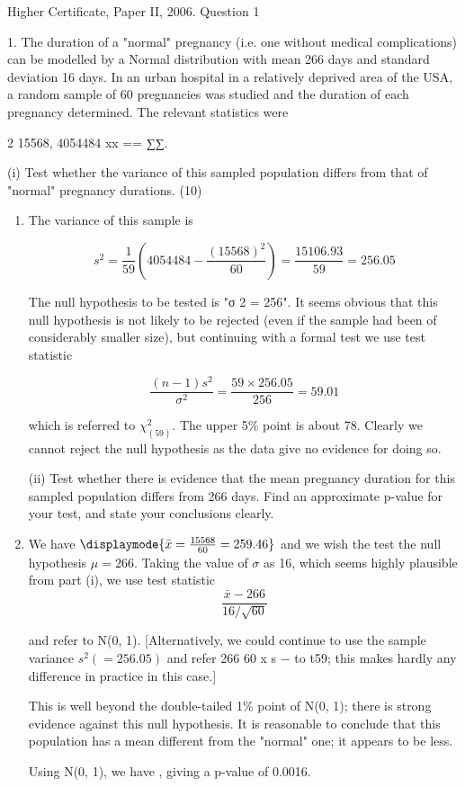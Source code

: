 \documentclass[a4paper,12pt]{article}
\begin{document}
Higher Certificate, Paper II, 2006.  Question 1 
\begin{framed}

1. The duration of a "normal" pregnancy (i.e. one without medical complications) can be modelled by a Normal distribution with mean 266 days and standard deviation 16 days.  In an urban hospital in a relatively deprived area of the USA, a random sample of 60 pregnancies was studied and the duration of each pregnancy determined.  The relevant statistics were 
 
2 15568, 4054484 xx == ∑∑. 
 
(i) Test whether the variance of this sampled population differs from that of "normal" pregnancy durations. (10) 
 

\end{framed}



 \begin{enumerate}
\item The variance of this sample is 

\[ s^2 = \frac{1}{59}\left( 4054484 - \frac{(15568)^2}{60} \right) = \frac{15106.93}{59} =256.05\]
 
 
The null hypothesis to be tested is "σ 2 = 256".  It seems obvious that this null hypothesis is not likely to be rejected (even if the sample had been of considerably smaller size), but continuing with a formal test we use test statistic 
 
\[  \frac{(n-1)s^2}{\sigma^2} = \frac{59 \times 256.05}{256} =59.01 \]
 
 
which is referred to $\chi^2_{(59)}$.  The upper 5\% point is about 78.  Clearly we cannot reject the null hypothesis as the data give no evidence for doing so. 

\begin{framed}
(ii) Test whether there is evidence that the mean pregnancy duration for this sampled population differs from 266 days.  Find an approximate p-value for your test, and state your conclusions clearly. 
\end{framed} 
\item We have  $ \displaymode{\bar{x} = \frac{15568}{60} = 259.46 }$  and we wish the test the null hypothesis $\mu=266$.  Taking the value of $\sigma$ as 16, which seems highly plausible from part (i), we use test statistic 
\[  \frac{\bar{x} - 266}{16 / \sqrt{60} }\]
 
and refer to N(0, 1). 
 [Alternatively, we could continue to use the sample variance $s^2 (= 256.05)$ and refer 266 60 x s − to t59;  this makes hardly any difference in practice in this case.] 
 
This is well beyond the double-tailed 1\% point of N(0, 1);  there is strong evidence against this null hypothesis.  It is reasonable to conclude that this population has a mean different from the "normal" one;  it appears to be less. 
 
Using N(0, 1), we have , giving a p-value of 0.0016. 
\end{enumerate}
\end{document}
